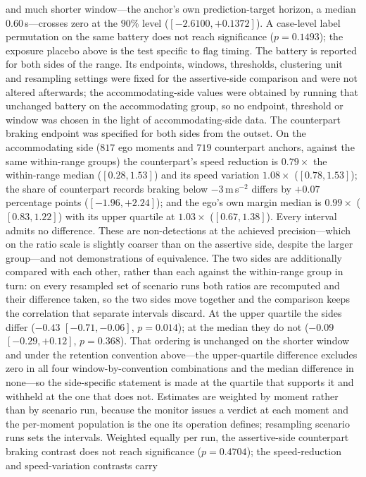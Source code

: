 \documentclass[12pt,a4paper]{article}
\begin{document}
and much shorter window---the anchor's own prediction-target horizon, a median $0.60$\,s---crosses
zero at the $90\%$ level ($[-2.6100, +0.1372]$). A case-level label permutation
on the same battery does not reach significance ($p=0.1493$); the exposure placebo above is the
test specific to flag timing.
The battery is reported for both sides of the range. Its endpoints, windows, thresholds, clustering
unit and resampling settings were fixed for the assertive-side comparison and were not altered
afterwards; the accommodating-side values were obtained by running that unchanged battery on the
accommodating group, so no endpoint, threshold or window was chosen in the light of
accommodating-side data. The counterpart braking endpoint was specified for both sides from the
outset. On the accommodating side ($817$ ego moments and $719$ counterpart anchors, against the same
within-range groups) the counterpart's speed reduction is $0.79\times$ the within-range median
($[0.28,1.53]$) and its speed variation $1.08\times$ ($[0.78,1.53]$); the share of counterpart
records braking below $-3$\,m\,s$^{-2}$ differs by $+0.07$ percentage points ($[-1.96,+2.24]$); and
the ego's own margin median is $0.99\times$ ($[0.83,1.22]$) with its upper quartile at $1.03\times$
($[0.67,1.38]$). Every interval admits no difference.
These are non-detections at the achieved precision---which on the ratio scale is slightly coarser
than on the assertive side, despite the larger group---and not demonstrations of equivalence.
The two sides are additionally compared with each other, rather than each against the within-range
group in turn: on every resampled set of scenario runs both ratios are recomputed and their
difference taken, so the two sides move together and the comparison keeps the correlation that
separate intervals discard. At the upper quartile the sides differ ($-0.43$ $[-0.71,-0.06]$,
$p=0.014$); at the median they do not ($-0.09$ $[-0.29,+0.12]$, $p=0.368$). That ordering is
unchanged on the shorter window and under the retention convention above---the upper-quartile
difference excludes zero in all four window-by-convention combinations and the median difference in
none---so the side-specific statement is made at the quartile that supports it and withheld at the
one that does not.
Estimates are weighted by moment rather than by scenario run, because the monitor issues a verdict
at each moment and the per-moment population is the one its operation defines; resampling scenario
runs sets the intervals. Weighted equally per run, the assertive-side counterpart braking contrast
does not reach significance ($p=0.4704$); the speed-reduction and speed-variation contrasts carry
\end{document}
